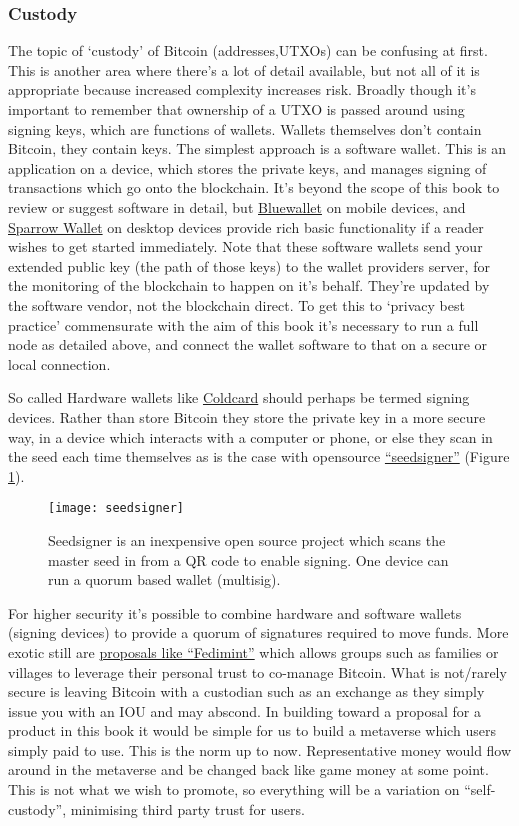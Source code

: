 \subsubsection{Custody}
The topic of `custody' of Bitcoin (addresses,UTXOs) can be confusing at first. This is another area where there's a lot of detail available, but not all of it is appropriate because increased complexity increases risk. Broadly though it's important to remember that ownership of a UTXO is passed around using signing keys, which are functions of wallets. Wallets themselves don't contain Bitcoin, they contain keys. The simplest approach is a software wallet. This is an application on a device, which stores the private keys, and manages signing of transactions which go onto the blockchain. It's beyond the scope of this book to review or suggest software in detail, but \href{https://bluewallet.io/}{Bluewallet} on mobile devices, and \href{https://sparrowwallet.com/}{Sparrow Wallet} on desktop devices provide rich basic functionality if a reader wishes to get started immediately. Note that these software wallets send your extended public key (the path of those keys) to the wallet providers server, for the monitoring of the blockchain to happen on it's behalf. They're updated by the software vendor, not the blockchain direct. To get this to `privacy best practice' commensurate with the aim of this book it's necessary to run a full node as detailed above, and connect the wallet software to that on a secure or local connection.\par
So called Hardware wallets like \href{https://coldcard.com/}{Coldcard} should perhaps be termed signing devices. Rather than store Bitcoin they store the private key in a more secure way, in a device which interacts with a computer or phone, or else they scan in the seed each time themselves as is the case with opensource \href{https://seedsigner.com/}{``seedsigner''} (Figure \ref{fig:seedsigner}).\par

\begin{figure}
  \centering
    \texttt{[image: seedsigner]}
  \caption{Seedsigner is an inexpensive open source project which scans the master seed in from a QR code to enable signing. One device can run a quorum based wallet (multisig).}
    \label{fig:seedsigner}
\end{figure}
For higher security it's possible to combine hardware and software wallets (signing devices) to provide a quorum of signatures required to move funds. More exotic still are \href{https://fedimint.org/}{proposals like ``Fedimint''} which allows groups such as families or villages to leverage their personal trust to co-manage Bitcoin. What is not/rarely secure is leaving Bitcoin with a custodian such as an exchange as they simply issue you with an IOU and may abscond. In building toward a proposal for a product in this book it would be simple for us to build a metaverse which users simply paid to use. This is the norm up to now. Representative money would flow around in the metaverse and be changed back like game money at some point. This is not what we wish to promote, so everything will be a variation on ``self-custody'', minimising third party trust for users.
